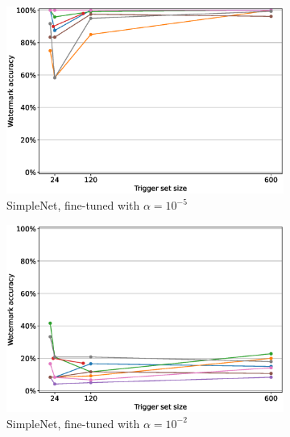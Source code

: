 \begin{figure}
    \centering
    \begin{subfigure}{0.41\linewidth}
        \includegraphics[width=\linewidth]{images/finetuning/simplenet_mnist_finetuning_per_arch_1e-05.eps}
        \caption{SimpleNet, fine-tuned with $\alpha=10^{-5}$}
        \label{fig:finetuning-smalllr-allmethods-perarch-simplenet_mnist}
    \end{subfigure}
    \quad
    \begin{subfigure}{0.41\linewidth}
        \includegraphics[width=\linewidth]{images/finetuning/simplenet_mnist_finetuning_per_arch_001.eps}
        \caption{SimpleNet, fine-tuned with $\alpha=10^{-2}$}
        \label{fig:finetuning-largelr-allmethods-perarch-simplenet_mnist}
    \end{subfigure}
    \quad
    \begin{subfigure}{0.41\linewidth}

\end{subfigure}
\end{figure}
